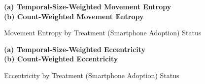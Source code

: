 \begin{figure}[ht!]
\centering
\caption{Movement Entropy by Treatment (Smartphone Adoption) Status}
\vspace{0.3cm}

\textbf{(a) Temporal-Size-Weighted Movement Entropy}\\


\vspace{0.3cm}
\textbf{(b) Count-Weighted Movement Entropy}\\


\label{fig:effect_of_smartphone_adoption_on_temporal_size_weighted_count_weighted_movement_entropy}
\end{figure}


\begin{figure}[ht!]
\centering
\caption{Eccentricity by Treatment (Smartphone Adoption) Status}
\vspace{0.3cm}

\textbf{(a) Temporal-Size-Weighted Eccentricity}\\


\vspace{0.3cm}
\textbf{(b) Count-Weighted Eccentricity}\\


\label{fig:effect_of_smartphone_adoption_on_temporal_size_weighted_count_weighted_eccentricity}
\end{figure}
